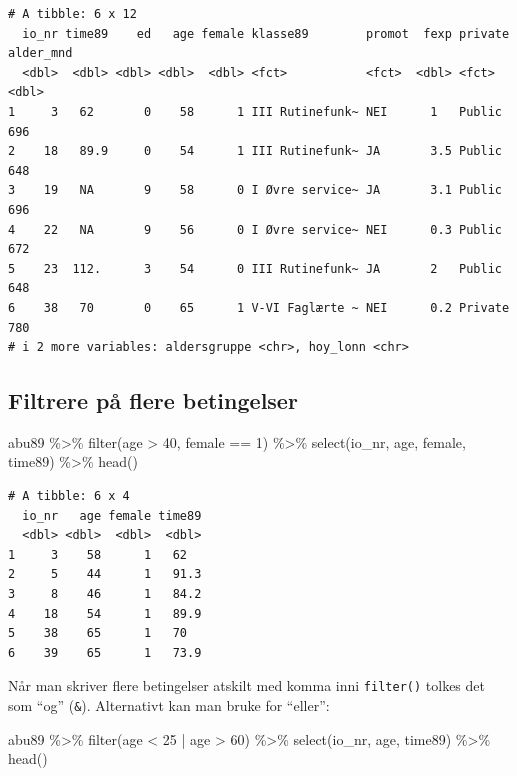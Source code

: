 \documentclass[
  norsk,
  letterpaper,
  DIV=11,
  numbers=noendperiod]{scrreprt}
\newenvironment{Shaded}{\begin{snugshade}}{\end{snugshade}}
\newcommand{\DecValTok}[1]{\textcolor[rgb]{0.68,0.00,0.00}{#1}}
\newcommand{\FunctionTok}[1]{\textcolor[rgb]{0.28,0.35,0.67}{#1}}
\newcommand{\NormalTok}[1]{\textcolor[rgb]{0.00,0.23,0.31}{#1}}
\newcommand{\SpecialCharTok}[1]{\textcolor[rgb]{0.37,0.37,0.37}{#1}}
\theoremstyle{definition}
\theoremstyle{remark}
\begin{document}
\begin{verbatim}
# A tibble: 6 x 12
  io_nr time89    ed   age female klasse89        promot  fexp private alder_mnd
  <dbl>  <dbl> <dbl> <dbl>  <dbl> <fct>           <fct>  <dbl> <fct>       <dbl>
1     3   62       0    58      1 III Rutinefunk~ NEI      1   Public        696
2    18   89.9     0    54      1 III Rutinefunk~ JA       3.5 Public        648
3    19   NA       9    58      0 I Øvre service~ JA       3.1 Public        696
4    22   NA       9    56      0 I Øvre service~ NEI      0.3 Public        672
5    23  112.      3    54      0 III Rutinefunk~ JA       2   Public        648
6    38   70       0    65      1 V-VI Faglærte ~ NEI      0.2 Private       780
# i 2 more variables: aldersgruppe <chr>, hoy_lonn <chr>
\end{verbatim}

\subsection{Filtrere på flere
betingelser}\label{filtrere-puxe5-flere-betingelser}

\begin{Shaded}
\begin{Highlighting}[]
\NormalTok{abu89 }\SpecialCharTok{\%\textgreater{}\%}
  \FunctionTok{filter}\NormalTok{(age }\SpecialCharTok{\textgreater{}} \DecValTok{40}\NormalTok{, female }\SpecialCharTok{==} \DecValTok{1}\NormalTok{) }\SpecialCharTok{\%\textgreater{}\%}
  \FunctionTok{select}\NormalTok{(io\_nr, age, female, time89) }\SpecialCharTok{\%\textgreater{}\%}
  \FunctionTok{head}\NormalTok{()}
\end{Highlighting}
\end{Shaded}

\begin{verbatim}
# A tibble: 6 x 4
  io_nr   age female time89
  <dbl> <dbl>  <dbl>  <dbl>
1     3    58      1   62  
2     5    44      1   91.3
3     8    46      1   84.2
4    18    54      1   89.9
5    38    65      1   70  
6    39    65      1   73.9
\end{verbatim}

Når man skriver flere betingelser atskilt med komma inni
\texttt{filter()} tolkes det som ``og'' (\texttt{\&}). Alternativt kan
man bruke \texttt{\textbar{}} for ``eller'':

\begin{Shaded}
\begin{Highlighting}[]
\NormalTok{abu89 }\SpecialCharTok{\%\textgreater{}\%}
  \FunctionTok{filter}\NormalTok{(age }\SpecialCharTok{\textless{}} \DecValTok{25} \SpecialCharTok{|}\NormalTok{ age }\SpecialCharTok{\textgreater{}} \DecValTok{60}\NormalTok{) }\SpecialCharTok{\%\textgreater{}\%}
  \FunctionTok{select}\NormalTok{(io\_nr, age, time89) }\SpecialCharTok{\%\textgreater{}\%}
  \FunctionTok{head}\NormalTok{()}
\end{Highlighting}
\end{Shaded}
\end{document}
